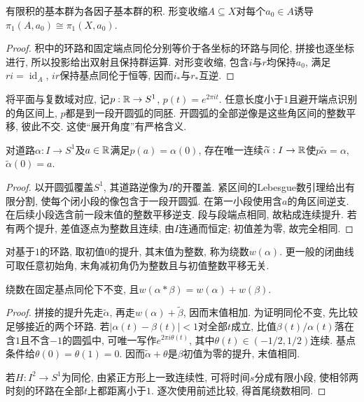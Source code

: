 \begin{proposition}\label{thm:pi1-product}
有限积的基本群为各因子基本群的积. 形变收缩$A\subseteq X$对每个$a_0\in A$诱导$\pi_1(A,a_0)\cong\pi_1(X,a_0)$.
\end{proposition}
\begin{proof}
积中的环路和固定端点同伦分别等价于各坐标的环路与同伦, 拼接也逐坐标进行, 所以投影给出双射且保持群运算. 对形变收缩, 包含$i$与$r$均保持$a_0$, 满足$ri=\operatorname{id}_A$, $ir$保持基点同伦于恒等, 因而$i_*$与$r_*$互逆.
\end{proof}

将平面与复数域对应, 记$p:\mathbb R\to S^1$, $p(t)=e^{2\pi it}$. 任意长度小于$1$且避开端点识别的角区间上, $p$都是到一段开圆弧的同胚. 开圆弧的全部逆像是这些角区间的整数平移, 彼此不交. 这使“展开角度”有严格含义.
\begin{lemma}\label{lem:circle-lift}
对道路$\alpha:I\to S^1$及$a\in\mathbb R$满足$p(a)=\alpha(0)$, 存在唯一连续$\widetilde\alpha:I\to\mathbb R$使$p\widetilde\alpha=\alpha$, $\widetilde\alpha(0)=a$.
\end{lemma}
\begin{proof}
以开圆弧覆盖$S^1$, 其道路逆像为$I$的开覆盖. 紧区间的Lebesgue数引理给出有限分割, 使每个闭小段的像包含于一段开圆弧. 在第一小段使用含$a$的角区间逆支. 在后续小段选含前一段末值的整数平移逆支. 段与段端点相同, 故粘成连续提升. 若有两个提升, 差值逐点为整数且连续, 由$I$连通而恒定; 初值差为零, 故完全相同.
\end{proof}

对基于$1$的环路, 取初值$0$的提升, 其末值为整数, 称为绕数$w(\alpha)$. 更一般的闭曲线可取任意初始角, 末角减初角仍为整数且与初值整数平移无关.
\begin{lemma}\label{lem:winding-homotopy}
绕数在固定基点同伦下不变, 且$w(\alpha*\beta)=w(\alpha)+w(\beta)$.
\end{lemma}
\begin{proof}
拼接的提升先走$\widetilde\alpha$, 再走$w(\alpha)+\widetilde\beta$, 因而末值相加. 为证明同伦不变, 先比较足够接近的两个环路. 若$|\alpha(t)-\beta(t)|<1$对全部$t$成立, 比值$\beta(t)/\alpha(t)$落在含$1$且不含$-1$的圆弧中, 可唯一写作$e^{2\pi i\theta(t)}$, 其中$\theta(t)\in(-1/2,1/2)$连续. 基点条件给$\theta(0)=\theta(1)=0$. 因而$\widetilde\alpha+\theta$是$\beta$初值为零的提升, 末值相同.

若$H:I^2\to S^1$为同伦, 由紧正方形上一致连续性, 可将时间$s$分成有限小段, 使相邻两时刻的环路在全部$t$上都距离小于$1$. 逐次使用前述比较, 得首尾绕数相同.
\end{proof}

